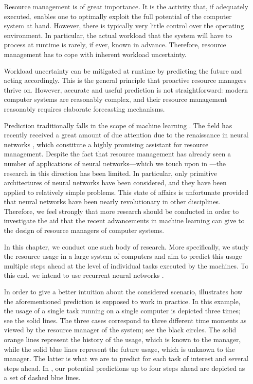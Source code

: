 Resource management is of great importance. It is the activity that, if
adequately executed, enables one to optimally exploit the full potential of the
computer system at hand. However, there is typically very little control over
the operating environment. In particular, the actual workload that the system
will have to process at runtime is rarely, if ever, known in advance. Therefore,
resource management has to cope with inherent workload uncertainty.

Workload uncertainty can be mitigated at runtime by predicting the future and
acting accordingly. This is the general principle that proactive resource
managers thrive on. However, accurate and useful prediction is not
straightforward: modern computer systems are reasonably complex, and their
resource management reasonably requires elaborate forecasting mechanisms.

Prediction traditionally falls in the scope of machine learning
\cite{hastie2013}. The field has recently received a great amount of due
attention due to the renaissance in neural networks \cite{goodfellow2016}, which
constitute a highly promising assistant for resource management. Despite the
fact that resource management has already seen a number of applications of
neural networks---which we touch upon in ---the research in
this direction has been limited. In particular, only primitive architectures of
neural networks have been considered, and they have been applied to relatively
simple problems. This state of affairs is unfortunate provided that neural
networks have been nearly revolutionary in other disciplines. Therefore, we feel
strongly that more research should be conducted in order to investigate the aid
that the recent advancements in machine learning can give to the design of
resource managers of computer systems.

In this chapter, we conduct one such body of research. More specifically, we
study the resource usage in a large system of computers and aim to predict this
usage multiple steps ahead at the level of individual tasks executed by the
machines. To this end, we intend to use recurrent neural networks
\cite{goodfellow2016}.

In order to give a better intuition about the considered scenario,
 illustrates how the aforementioned prediction is
supposed to work in practice. In this example, the  usage of a single
task running on a single computer is depicted three times; see the solid lines.
The three cases correspond to three different time moments as viewed by the
resource manager of the system; see the black circles. The solid orange lines
represent the history of the usage, which is known to the manager, while the
solid blue lines represent the future usage, which is unknown to the manager.
The latter is what we are to predict for each task of interest and several steps
ahead. In , our potential predictions up to four steps
ahead are depicted as a set of dashed blue lines.

